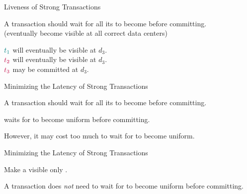 \begin{frame}{Liveness of Strong Transactions}
  \begin{center}
    A  transaction should wait for all its
     to become  before committing. \\[3pt]
    {\footnotesize (eventually become visible at all correct data centers)}

    \vspace{0.30cm}

    \pause
    $\textcolor{teal}{t_{1}}$ will eventually be visible at $d_{3}$. \\[3pt]
    \pause
    $\textcolor{purple}{t_{2}}$ will eventually be visible at $d_{3}$. \\[3pt]
    \pause
    $\textcolor{purple}{t_{3}}$ may be committed at $d_{3}$. \\[3pt]
  \end{center}
\end{frame}

\begin{frame}{Minimizing the Latency of Strong Transactions}
  \begin{center}
    A  transaction should wait for all its
     to become  before committing.

    \vspace{0.30cm}

    \pause
    \vspace{0.20cm}
     waits for  
    to become uniform before committing.

    \pause
    \vspace{0.50cm}
    However, it may cost too much to wait for  
    to become uniform.
  \end{center}
\end{frame}

\begin{frame}{Minimizing the Latency of Strong Transactions}
  \begin{center}
    Make a   visible
    only .

    \vspace{0.50cm}

    \pause
    \vspace{0.30cm}
    A  transaction does \emph{not}
    need to wait for  
    to become uniform before committing.
  \end{center}
\end{frame}

